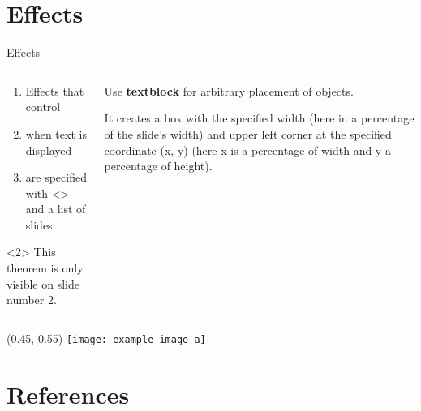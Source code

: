 \documentclass[USenglish, aspectratio = 43]{beamer}
\begin{document}
\section{Effects}

\begin{frame}{Effects}
    \begin{columns}[onlytextwidth]
        \begin{column}{0.49\textwidth}
            \begin{enumerate}[<+-|alert@+>]
                \item
                Effects that control

                \item
                when text is displayed

                \item
                are specified with <> and a list of slides.
            \end{enumerate}

            \begin{theorem}<2>
                This theorem is only visible on slide number 2.
            \end{theorem}
        \end{column}
        \begin{column}{0.49\textwidth}
            Use \textbf<2->{textblock} for arbitrary placement of objects.

            \pause
            \medskip

            It creates a box
            with the specified width (here in a percentage of the slide's width)
            and upper left corner at the specified coordinate (x, y)
            (here x is a percentage of width and y a percentage of height).
        \end{column}
    \end{columns}
    
    {
        \begin{textblock}{0.3}(0.45, 0.55)
            \texttt{[image: example-image-a]}
        \end{textblock}
    }
\end{frame}

\section{References}
\end{document}
